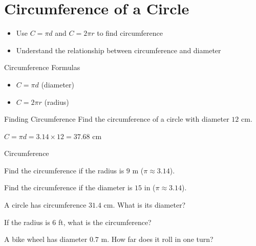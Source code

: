 \section{Circumference of a Circle}

\begin{learningGoals}
\begin{itemize}
    \item Use $C = \pi d$ and $C = 2\pi r$ to find circumference
    \item Understand the relationship between circumference and diameter
\end{itemize}
\end{learningGoals}

\begin{conceptBox}{Circumference Formulas}
\begin{itemize}[leftmargin=*]
    \item $C = \pi d$ (diameter)
    \item $C = 2\pi r$ (radius)
\end{itemize}
\end{conceptBox}

\begin{workedExample}{Finding Circumference}
Find the circumference of a circle with diameter $12$ cm.

$C = \pi d = 3.14 \times 12 = 37.68$ cm
\end{workedExample}


\begin{practiceBox}{Circumference}
\resetProblems

\prob Find the circumference if the radius is $9$ m ($\pi \approx 3.14$).

\prob Find the circumference if the diameter is $15$ in ($\pi \approx 3.14$).

\prob A circle has circumference $31.4$ cm. What is its diameter?

\prob If the radius is $6$ ft, what is the circumference?

\prob A bike wheel has diameter $0.7$ m. How far does it roll in one turn?

\end{practiceBox}
